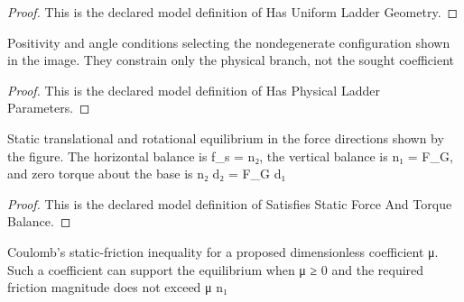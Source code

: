 \begin{proof}
  This is the declared model definition of Has Uniform Ladder Geometry.
\end{proof}
\begin{definition}
  \label{def:physics:phyx-mini-0709:phyxminiproblems-problemphyxmini0709-hasphysicalladderparameters}
  Positivity and angle conditions selecting the nondegenerate configuration shown in the image. They constrain only the physical branch, not the sought coefficient
\end{definition}
\begin{proof}
  This is the declared model definition of Has Physical Ladder Parameters.
\end{proof}
\begin{definition}
  \label{def:physics:phyx-mini-0709:phyxminiproblems-problemphyxmini0709-satisfiesstaticforceandtorquebalance}
  Static translational and rotational equilibrium in the force directions shown by the figure. The horizontal balance is f\_s = n₂, the vertical balance is n₁ = F\_G, and zero torque about the base is n₂ d₂ = F\_G d₁
\end{definition}
\begin{proof}
  This is the declared model definition of Satisfies Static Force And Torque Balance.
\end{proof}
\begin{definition}
  \label{def:physics:phyx-mini-0709:phyxminiproblems-problemphyxmini0709-coefficientpreventsslip}
  Coulomb's static-friction inequality for a proposed dimensionless coefficient μ. Such a coefficient can support the equilibrium when μ ≥ 0 and the required friction magnitude does not exceed μ n₁
\end{definition}
